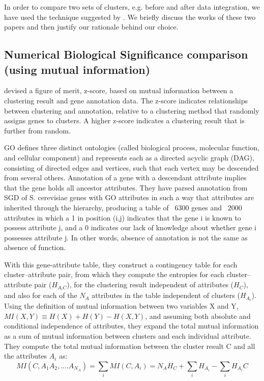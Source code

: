 In order to compare two sets of clusters, e.g. before and after data integration, we have used the technique suggested by \citet{Gibons2002Judging}. We briefly discuss 
the works of these two papers and then justify our rationale behind our choice.

\subsection{Numerical Biological Significance comparison (using mutual information)} \label{num_biosig_mi}
\citet{Gibons2002Judging} devised a figure of merit, z-score, based on mutual information between a clustering result and gene annotation data. The z-score indicates relationships between 
clustering and annotation, relative to a clustering method that randomly assigns genes to clusters. A higher z-score indicates a clustering result that is further 
from random. 

GO defines three distinct ontologies (called biological process, molecular function, and cellular component) and represents each as a directed acyclic graph (DAG), 
consisting of directed edges and vertices, such that each vertex may be descended from several others. Annotation of a gene with a descendant attribute implies that the 
gene holds all ancestor attributes. They have parsed annotation from SGD of S. cerevisiae genes with GO attributes in such a way that attributes are inherited 
through the hierarchy, producing a table of ~6300 genes and ~2000 attributes in which a 1 in position (i,j) indicates that the gene i is known to possess attribute 
j, and a 0 indicates our lack of knowledge about whether gene i possesses attribute j. In other words, absence of annotation is not the same as absence of function.

With this gene-attribute table, they construct a contingency table for each cluster–attribute pair, from which they compute the entropies for each cluster–attribute pair ($H_{A_{i}C}$), 
for the clustering result independent of attributes ($H_{C}$), and also for each of the $N_{A}$ attributes in the table independent of clusters ($H_{A_{i}}$). 
Using the definition of mutual information between two variables X and Y, $MI(X,Y) \equiv H(X)+H(Y)−H(X,Y)$, and assuming both absolute and conditional independence of attributes, 
they expand the total mutual information as a sum of mutual information between clusters and each individual attribute. 
They compute the total mutual information between the cluster result C and all the attributes $A_{i}$ as:
\[
MI(C,A_{1}A_{2},....A_{N_{A}}) = \sum_{i}MI(C,A_{i}) = N_{A}H_{C} + \sum_{i}H_{A_{i}}-\sum_{i}H_{A_{i}}C
\]

